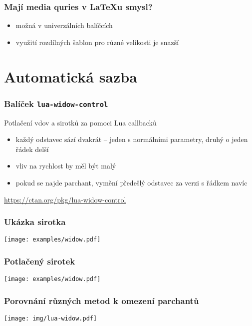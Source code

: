 \begin{frame}
  \frametitle{Mají media quries v \LaTeX u smysl?}
  \begin{itemize}
    \item možná v univerzálních balíčcích
    \item využití rozdílných šablon pro různé velikosti je snazší
  \end{itemize}
\end{frame}


\section{Automatická sazba}

\begin{frame}
  \frametitle{Balíček \texttt{lua-widow-control}}
  Potlačení vdov a sirotků za pomoci Lua callbacků
  \begin{itemize}
    \item každý odstavec sází dvakrát -- jeden s normálními parametry, druhý o jeden řádek delší
    \item vliv na rychlost by měl být malý
    
    \item pokud se najde parchant, vymění předešlý odstavec za verzi s řádkem navíc
  \end{itemize}
  \url{https://ctan.org/pkg/lua-widow-control}
\end{frame}

\begin{frame}
  \frametitle{Ukázka sirotka}
  \begin{center}
    \texttt{[image: examples/widow.pdf]}
  \end{center}
\end{frame}

\begin{frame}
  \frametitle{Potlačený sirotek}
  \begin{center}
    \texttt{[image: examples/widow.pdf]}
  \end{center}
\end{frame}

\begin{frame}
  \frametitle{Porovnání různých metod k omezení parchantů}
  \begin{priklad}
  \begin{center}
  \texttt{[image: img/lua-widow.pdf]}
  \end{center}
\end{priklad}
\end{frame}

